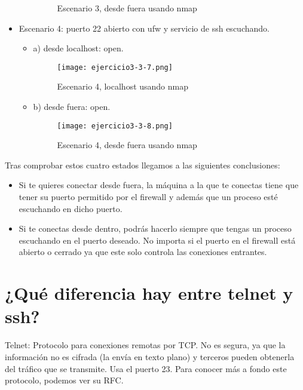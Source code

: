 \begin{itemize}
\begin{itemize}
\begin{figure}[H]
						\caption{Escenario 3, desde fuera usando nmap}
					\end{figure}
			\end{itemize}
		\item Escenario 4: puerto 22 abierto con ufw y servicio de ssh escuchando.
			\begin{itemize}
				\item a) desde localhost: open.
					\begin{figure}[H] 
						\centering
						\texttt{[image: ejercicio3-3-7.png]} 
						\label{figura35} 
						
						\caption{Escenario 4, localhost usando nmap}
					\end{figure}
				\item b) desde fuera: open.
					\begin{figure}[H] 
						\centering
						\texttt{[image: ejercicio3-3-8.png]} 
						\label{figura36} 
						
						\caption{Escenario 4, desde fuera usando nmap}
					\end{figure}
			\end{itemize}
	\end{itemize}
	
	
	Tras comprobar estos cuatro estados llegamos a las siguientes conclusiones:
	\begin{itemize}
		\item Si te quieres conectar desde fuera, la máquina a la que te conectas tiene que tener su puerto permitido por el firewall y además que un proceso esté escuchando en dicho puerto.
		\item Si te conectas desde dentro, podrás hacerlo siempre que tengas un proceso escuchando en el puerto deseado. No importa si el puerto en el firewall está abierto o cerrado ya que este solo controla las conexiones entrantes. 
	\end{itemize}
	
	\section{¿Qué diferencia hay entre telnet y ssh?}
	
	Telnet\cite{ejercicio4-1,ejercicio4-4}: Protocolo para conexiones remotas por TCP. No es segura, ya que la información no es cifrada (la envía en texto plano) y terceros pueden obtenerla del tráfico que se transmite. Usa el puerto 23. Para conocer más a fondo este protocolo, podemos ver su RFC\cite{ejercicio4-2,ejercicio4-3}.
	\\
	

